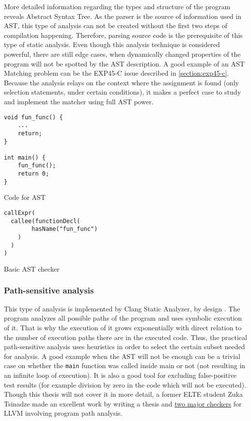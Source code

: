 More detailed information regarding the types and structure of the program reveals Abstract Syntax Tree. As the parser is the source of information used in AST, this type of analysis can not be created without the first two steps of compilation happening. Therefore, parsing source code is the prerequisite of this type of static analysis. Even though this analysis technique is considered powerful, there are still edge cases, when dynamically changed properties of the program will not be spotted by the AST description. A good example of an AST Matching problem can be the EXP45-C issue described in \autoref{section:exp45-c}. Because the analysis relays on the context where the assignment is found (only selection statements, under certain conditions), it makes a perfect case to study and implement the matcher using full AST power. 

\begin{listing}[H]
\begin{verbatim}
void fun_func() {
    ... 
    return;
}

int main() {
    fun_func();
    return 0;
}
\end{verbatim}
\caption{Code for AST}
\label{code:ast-text-analysis-code}
\end{listing}

\begin{listing}[H]
\begin{verbatim}
callExpr(
  callee(functionDecl(
        hasName("fun_func")
    )
  )
)
\end{verbatim}
\caption{Basic AST checker}
\label{code:ast-analysis-ast}
\end{listing}


\subsubsection{Path-sensitive analysis}

This type of analysis is implemented by Clang Static Analyzer, by design \cite{clang-sa-guide}. The program analyzes all possible paths of the program and uses symbolic execution of it. That is why the execution of it grows exponentially with direct relation to the number of execution paths there are in the executed code. Thus, the practical path-sensitive analysis uses heuristics in order to select the certain subset needed for analysis. A good example when the AST will not be enough can be a trivial case on whether the \lstinline{main} function was called inside main or not (not resulting in an infinite loop of execution). It is also a good tool for excluding false-positive test results (for example division by zero in the code which will not be executed). Though this thesis will not cover it in more detail, a former ELTE student Zuka Tsinadze made an excellent work by writing a thesis and \href{https://github.com/llvm/llvm-project/tree/main/clang/lib/StaticAnalyzer/Checkers/cert}{two major checkers} for LLVM involving program path analysis. 


